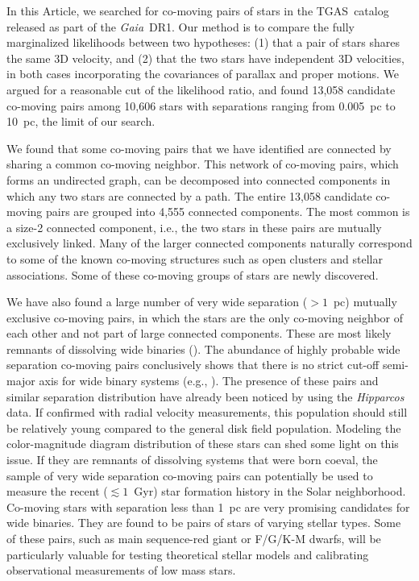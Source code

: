 \documentclass[manuscript, letterpaper]{aastex6}
\newcommand{\project}[1]{\textsl{#1}}
\newcommand{\acronym}[1]{{\small{#1}}}
\newcommand{\gaia}{\project{Gaia}}
\newcommand{\documentname}{Article}
\newcommand{\tgas}{\acronym{TGAS}}
\begin{document}
In this \documentname, we searched for co-moving pairs of stars in the
\tgas\ catalog released as part of the \gaia\ DR1.
Our method is to compare the fully marginalized likelihoods between two
hypotheses: (1) that a pair of
stars shares the same 3D velocity, and (2) that the two stars have independent
3D velocities, in both cases incorporating the covariances of parallax and
proper motions.
We argued for a reasonable cut of the likelihood ratio, and found
13,058 candidate co-moving pairs among 10,606 stars
with separations ranging from 0.005~pc to 10~pc, the limit of our search.

We found that some co-moving pairs that we have identified are connected
by sharing a common co-moving neighbor.
This network of co-moving pairs, which forms an undirected graph,
can be decomposed into connected components in which any two stars are connected
by a path.
The entire 13,058 candidate co-moving pairs are grouped into 4,555 connected
components. The most common is a size-2 connected component, i.e., the two
stars in these pairs are mutually exclusively linked.
Many of the larger connected components
naturally correspond to some of the known co-moving structures
such as open clusters and stellar associations.
Some of these co-moving groups of stars are newly discovered.

We have also found a large number of very wide separation ($>1$~pc)
mutually exclusive co-moving pairs, in which the stars are the only co-moving neighbor
of each other and not part of large connected components.
These are most likely remnants of dissolving wide binaries (\citealt{Jiang:2010aa}).
The abundance of highly probable wide separation co-moving pairs
conclusively shows that there is no strict cut-off semi-major axis for wide binary systems
(e.g., \citealt{Wasserman:1987aa}).
The presence of these pairs and similar separation distribution have already
been noticed by \citealt{Shaya:2011aa} using the \project{Hipparcos} data.
If confirmed with radial velocity measurements, this population should still be
relatively young compared to the general disk field population.
Modeling the color-magnitude diagram distribution of these stars can shed some
light on this issue.
If they are remnants of dissolving systems that were born coeval,
the sample of very wide separation co-moving pairs can potentially be used
to measure the recent ($\lesssim 1$~Gyr)
star formation history in the Solar neighborhood.
Co-moving stars with separation less than 1~pc are very promising candidates
for wide binaries. They are found to be pairs of stars of varying stellar types.
Some of these pairs, such as main sequence-red giant or F/G/K-M dwarfs,
will be particularly valuable for testing theoretical
stellar models and calibrating observational measurements of low mass stars.
\end{document}
